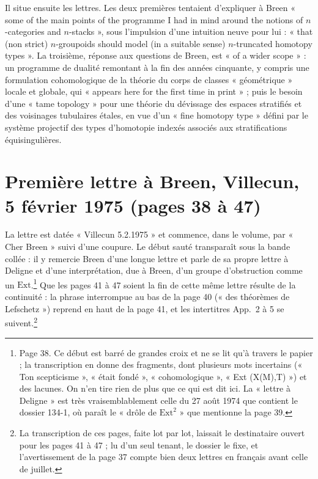 \documentclass[11pt,a4paper]{article}
\begin{document}
Il situe ensuite les lettres. Les deux premières tentaient d'expliquer à
Breen « some of the main points of the programme I had in mind around the
notions of $n$-categories and $n$-stacks », sous l'impulsion d'une intuition
neuve pour lui : « that (non strict) $n$-groupoids should model (in a
suitable sense) $n$-truncated homotopy types ». La troisième, réponse aux
questions de Breen, est « of a wider scope » : un programme de dualité
remontant à la fin des années cinquante, y compris une formulation
cohomologique de la théorie du corps de classes « géométrique » locale et
globale, qui « appears here for the first time in print » ; puis le besoin
d'une « tame topology » pour une théorie du dévissage des espaces
stratifiés et des voisinages tubulaires étales, en vue d'un « fine homotopy
type » défini par le système projectif des types d'homotopie indexés
associés aux stratifications équisingulières.

\section*{Première lettre à Breen, Villecun, 5 février 1975 (pages 38 à 47)}

La lettre est datée « Villecun 5.2.1975 » et commence, dans le volume, par
« Cher Breen » suivi d'une coupure. Le début sauté transparaît sous la bande
collée : il y remercie Breen d'une longue lettre et parle de sa propre
lettre à Deligne et d'une interprétation, due à Breen, d'un groupe
d'obstruction comme un $\mathrm{Ext}$.\footnote{Page 38. Ce début est barré
de grandes croix et ne se lit qu'à travers le papier ; la transcription en
donne des fragments, dont plusieurs mots incertains (« Ton scepticisme »,
« était fondé », « cohomologique », « Ext (X(M),T) ») et des lacunes. On n'en
tire rien de plus que ce qui est dit ici. La « lettre à Deligne » est très
vraisemblablement celle du 27 août 1974 que contient le dossier 134-1, où
paraît le « drôle de $\mathrm{Ext}^2$ » que mentionne la page 39.}
Que les pages 41 à 47 soient la fin de cette même lettre résulte de la
continuité : la phrase interrompue au bas de la page 40 (« des théorèmes de
Lefschetz ») reprend en haut de la page 41, et les intertitres App.~2 à 5 se
suivent.\footnote{La transcription de ces pages, faite lot par lot, laissait
le destinataire ouvert pour les pages 41 à 47 ; lu d'un seul tenant, le
dossier le fixe, et l'avertissement de la page 37 compte bien deux lettres en
français avant celle de juillet.}

\end{document}
